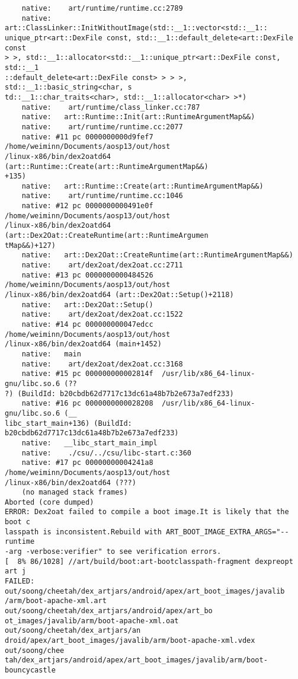 \begin{lstlisting}
    native:    art/runtime/runtime.cc:2789
    native:   art::ClassLinker::InitWithoutImage(std::__1::vector<std::__1::
unique_ptr<art::DexFile const, std::__1::default_delete<art::DexFile const
> >, std::__1::allocator<std::__1::unique_ptr<art::DexFile const, std::__1
::default_delete<art::DexFile const> > > >, std::__1::basic_string<char, s
td::__1::char_traits<char>, std::__1::allocator<char> >*)
    native:    art/runtime/class_linker.cc:787
    native:   art::Runtime::Init(art::RuntimeArgumentMap&&)
    native:    art/runtime/runtime.cc:2077
    native: #11 pc 0000000000d9fef7  /home/weiminn/Documents/aosp13/out/host
/linux-x86/bin/dex2oatd64 (art::Runtime::Create(art::RuntimeArgumentMap&&)
+135)
    native:   art::Runtime::Create(art::RuntimeArgumentMap&&)
    native:    art/runtime/runtime.cc:1046
    native: #12 pc 0000000000491e0f  /home/weiminn/Documents/aosp13/out/host
/linux-x86/bin/dex2oatd64 (art::Dex2Oat::CreateRuntime(art::RuntimeArgumen
tMap&&)+127)
    native:   art::Dex2Oat::CreateRuntime(art::RuntimeArgumentMap&&)
    native:    art/dex2oat/dex2oat.cc:2711
    native: #13 pc 0000000000484526  /home/weiminn/Documents/aosp13/out/host
/linux-x86/bin/dex2oatd64 (art::Dex2Oat::Setup()+2118)
    native:   art::Dex2Oat::Setup()
    native:    art/dex2oat/dex2oat.cc:1522
    native: #14 pc 000000000047edcc  /home/weiminn/Documents/aosp13/out/host
/linux-x86/bin/dex2oatd64 (main+1452)
    native:   main
    native:    art/dex2oat/dex2oat.cc:3168
    native: #15 pc 000000000002814f  /usr/lib/x86_64-linux-gnu/libc.so.6 (??
?) (BuildId: b20cbdb62d7717c13dc61a48b7b2e673a7edf233)
    native: #16 pc 0000000000028208  /usr/lib/x86_64-linux-gnu/libc.so.6 (__
libc_start_main+136) (BuildId: b20cbdb62d7717c13dc61a48b7b2e673a7edf233)
    native:   __libc_start_main_impl
    native:    ./csu/../csu/libc-start.c:360
    native: #17 pc 00000000004241a8  /home/weiminn/Documents/aosp13/out/host
/linux-x86/bin/dex2oatd64 (???)
    (no managed stack frames)
Aborted (core dumped)
ERROR: Dex2oat failed to compile a boot image.It is likely that the boot c
lasspath is inconsistent.Rebuild with ART_BOOT_IMAGE_EXTRA_ARGS="--runtime
-arg -verbose:verifier" to see verification errors.
[  8% 86/1028] //art/build/boot:art-bootclasspath-fragment dexpreopt art j
FAILED: out/soong/cheetah/dex_artjars/android/apex/art_boot_images/javalib
/arm/boot-apache-xml.art out/soong/cheetah/dex_artjars/android/apex/art_bo
ot_images/javalib/arm/boot-apache-xml.oat out/soong/cheetah/dex_artjars/an
droid/apex/art_boot_images/javalib/arm/boot-apache-xml.vdex out/soong/chee
tah/dex_artjars/android/apex/art_boot_images/javalib/arm/boot-bouncycastle

\end{lstlisting}
